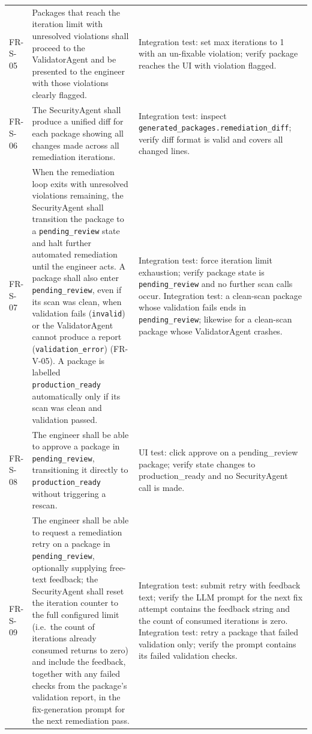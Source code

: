 \begin{longtable}{@{}p{}p{}p{}@{}}
FR-S-05 & Packages that reach the iteration limit with unresolved violations
  shall proceed to the ValidatorAgent and be presented to the engineer
  with those violations clearly flagged. &
  Integration test: set max iterations to 1 with an un-fixable violation;
  verify package reaches the UI with violation flagged. \\

FR-S-06 & The SecurityAgent shall produce a unified diff for each package
  showing all changes made across all remediation iterations. &
  Integration test: inspect \texttt{generated\_packages.remediation\_diff};
  verify diff format is valid and covers all changed lines. \\

FR-S-07 & When the remediation loop exits with unresolved violations
  remaining, the SecurityAgent shall transition the package to a
  \texttt{pending\_review} state and halt further automated remediation
  until the engineer acts. A package shall also enter
  \texttt{pending\_review}, even if its scan was clean, when validation
  fails (\texttt{invalid}) or the ValidatorAgent cannot produce a report
  (\texttt{validation\_error}) (FR-V-05). A package is labelled
  \texttt{production\_ready} automatically only if its scan was clean and
  validation passed. &
  Integration test: force iteration limit exhaustion; verify package
  state is \texttt{pending\_review} and no further scan calls occur.
  Integration test: a clean-scan package whose validation fails ends in
  \texttt{pending\_review}; likewise for a clean-scan package whose
  ValidatorAgent crashes. \\

FR-S-08 & The engineer shall be able to approve a package in
  \texttt{pending\_review}, transitioning it directly to
  \texttt{production\_ready} without triggering a rescan. &
  UI test: click approve on a pending\_review package; verify state
  changes to production\_ready and no SecurityAgent call is made. \\

FR-S-09 & The engineer shall be able to request a remediation retry on a
  package in \texttt{pending\_review}, optionally supplying free-text
  feedback; the SecurityAgent shall reset the iteration counter to the
  full configured limit (i.e.\ the count of iterations already consumed
  returns to zero) and include the feedback, together with any failed
  checks from the package's validation report, in the fix-generation
  prompt for the next remediation pass. &
  Integration test: submit retry with feedback text; verify the LLM
  prompt for the next fix attempt contains the feedback string and the
  count of consumed iterations is zero. Integration test: retry a package
  that failed validation only; verify the prompt contains its failed
  validation checks. \\


\end{longtable}
